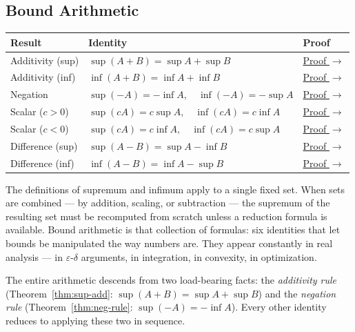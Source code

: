 
\subsection{Bound Arithmetic}
\label{sec:bound-arithmetic}

\begin{tcolorbox}[colback=gray!6, colframe=gray!40, arc=2pt,
  left=6pt, right=6pt, top=4pt, bottom=4pt,
  title={\small\textbf{Bound Arithmetic — Quick Reference}},
  fonttitle=\small\bfseries]
\renewcommand{\arraystretch}{1.4}
\begin{tabular}{@{}p{} p{} p{}@{}}
\textbf{Result} & \textbf{Identity} & \textbf{Proof} \\
\midrule
Additivity (sup)
  & $\sup(A+B)=\sup A+\sup B$
  & \hyperref[prf:additivity-of-supremums]{Proof $\to$} \\
Additivity (inf)
  & $\inf(A+B)=\inf A+\inf B$
  & \hyperref[prf:additivity-of-infimums]{Proof $\to$} \\
Negation
  & $\sup(-A)=-\inf A,\quad\inf(-A)=-\sup A$
  & \hyperref[prf:supremum-infimum-swap]{Proof $\to$} \\
Scalar ($c>0$)
  & $\sup(cA)=c\sup A,\quad\inf(cA)=c\inf A$
  & \hyperref[prf:infimum-positive-scalar-multiple]{Proof $\to$} \\
Scalar ($c<0$)
  & $\sup(cA)=c\inf A,\quad\inf(cA)=c\sup A$
  & \hyperref[prf:supremum-infimum-swap]{Proof $\to$} \\
Difference (sup)
  & $\sup(A-B)=\sup A-\inf B$
  & \hyperref[prf:supremum-set-difference]{Proof $\to$} \\
Difference (inf)
  & $\inf(A-B)=\inf A-\sup B$
  & \hyperref[prf:supremum-set-difference]{Proof $\to$} \\
\end{tabular}
\end{tcolorbox}

\begin{remark*}
The definitions of supremum and infimum apply to a single fixed set.
When sets are combined — by addition, scaling, or subtraction — the
supremum of the resulting set must be recomputed from scratch unless a
reduction formula is available.
Bound arithmetic is that collection of formulas: six identities that let
bounds be manipulated the way numbers are.
They appear constantly in real analysis — in $\varepsilon$-$\delta$ arguments,
in integration, in convexity, in optimization.

The entire arithmetic descends from two load-bearing facts:
the \emph{additivity rule}
(Theorem~\ref{thm:sup-add}: $\sup(A+B) = \sup A + \sup B$)
and the \emph{negation rule}
(Theorem~\ref{thm:neg-rule}: $\sup(-A) = -\inf A$).
Every other identity reduces to applying these two in sequence.
\end{remark*}

